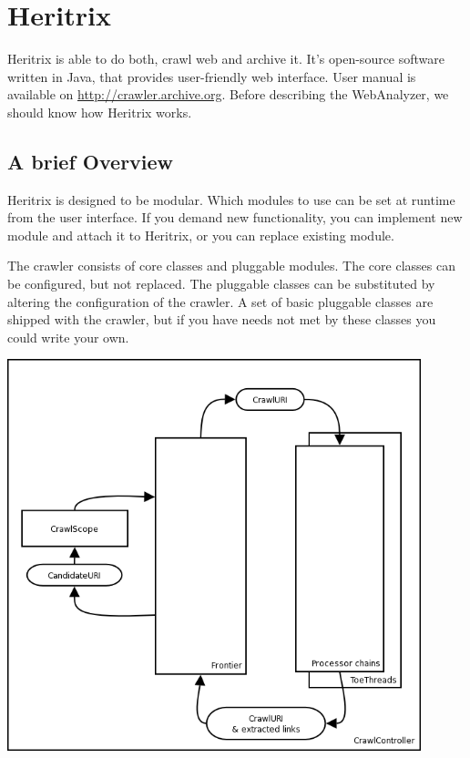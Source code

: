 \documentclass[11pt,a4paper]{article}
\begin{document}
\newpage
\section{Heritrix}

Heritrix is able to do both, crawl web and archive it. It's open-source software written in Java, that provides user-friendly web interface. User manual is available on \url{http://crawler.archive.org}. Before describing the WebAnalyzer, we should know how Heritrix works.

\subsection{A brief Overview}
Heritrix is designed to be modular. Which modules to use can be set at runtime from the user interface. If you demand new functionality, you can implement new module and attach it to Heritrix, or you can replace existing module.

The crawler consists of core classes and pluggable modules. The core classes can be configured, but not replaced. The pluggable classes can be substituted by altering the configuration of the crawler. A set of basic pluggable classes are shipped with the crawler, but if you have needs not met by these classes you could write your own.

\begin{center}
\includegraphics[width=120mm]{crawler_overview1.png}
\end{center}
\end{document}
